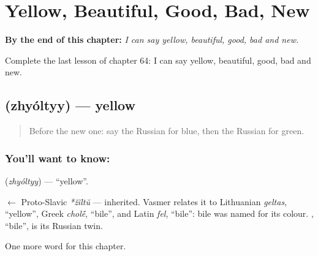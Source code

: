 
\chapter{Yellow, Beautiful, Good, Bad, New}
\label{ch:ru-yellow-beautiful-good-bad-new}

\begin{chapteropening}
\textbf{By the end of this chapter:} \emph{I can say yellow, beautiful, good, bad and new.}

Complete the last lesson of chapter 64: I can say yellow, beautiful, good, bad and new.
\end{chapteropening}

\section[\texorpdfstring{\ru{жёлтый} (zhyóltyy)}{жёлтый (zhyóltyy)}]{ (zhyóltyy) — yellow}

\label{lesson:RU-C64-yellow}



\begin{quote}
Before the new one: say the Russian for blue, then the Russian for green.
\end{quote}

\subsection*{You'll want to know: }
\textbf{} (\emph{zhyóltyy}) — \textquotedblleft{}yellow\textquotedblright{}.

\begin{cousinweb}
\textbf{} $\leftarrow$ Proto-Slavic \emph{*žĭltŭ} — inherited. Vasmer relates it to Lithuanian \emph{geltas}, \textquotedblleft{}yellow\textquotedblright{}, Greek \emph{chol\'{\={e}}}, \textquotedblleft{}bile\textquotedblright{}, and Latin \emph{fel}, \textquotedblleft{}bile\textquotedblright{}: bile was named for its colour. \emph{}, \textquotedblleft{}bile\textquotedblright{}, is its Russian twin.
\end{cousinweb}

\begin{grammarlens}[title={What you've built}]
One more word for this chapter.
\end{grammarlens}

